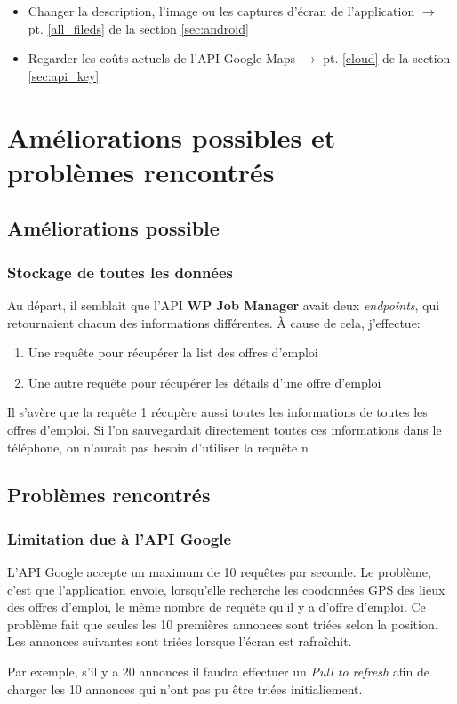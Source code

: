 \documentclass[french]{report}
\begin{document}
\begin{itemize}
    \item Changer la description, l'image ou les captures d'écran de l'application
    $\rightarrow$ pt. \ref{all_fileds} de la section \ref{sec:android}
    \item Regarder les coûts actuels de l'API Google Maps $\rightarrow$ pt. \ref{cloud} de la section \ref{sec:api_key}
\end{itemize}


\chapter{Améliorations possibles et problèmes rencontrés}

\section{Améliorations possible}

\subsection{Stockage de toutes les données}
Au départ, il semblait que l'API \textbf{WP Job Manager} avait deux \textit{endpoints},
qui retournaient chacun des informations différentes. \`A cause de cela, j'effectue:
\begin{enumerate}
    \item Une requ\^ete pour récupérer la list des offres d'emploi
    \item Une autre requ\^ete pour récupérer les détails d'une offre d'emploi
\end{enumerate}
Il s'avère que la requ\^ete 1 récupère aussi toutes les informations de toutes les
offres d'emploi. Si l'on sauvegardait directement toutes ces informations dans le téléphone,
on n'aurait pas besoin d'utiliser la requ\^ete n

\section{Problèmes rencontrés}

\subsection{Limitation due à l'API Google}
L'API Google accepte un maximum de 10 requ\^etes par seconde. Le problème,
c'est que l'application envoie, lorsqu'elle recherche les coodonnées GPS des lieux 
des offres d'emploi, le m\^eme nombre de requ\^ete qu'il y a d'offre d'emploi. Ce
problème fait que seules les 10 premières annonces sont triées selon la position.
Les annonces suivantes sont triées lorsque l'écran est rafra\^ichit.

Par exemple, s'il y a 20 annonces il faudra effectuer un \textit{Pull to refresh }
afin de charger les 10 annonces qui n'ont pas pu \^etre triées initialiement.
\end{document}
